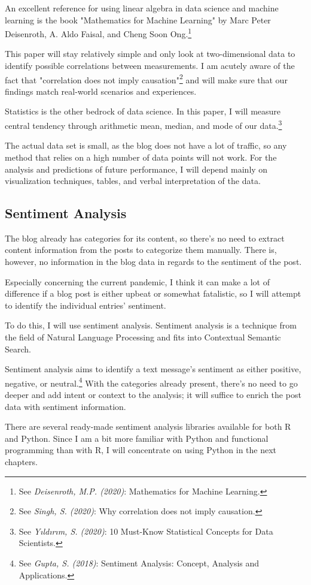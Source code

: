 An excellent reference for using linear algebra in data science and machine learning is the book "Mathematics for Machine Learning" by Marc Peter Deisenroth, A. Aldo Faisal, and Cheng Soon Ong.\footnote{See \textit{Deisenroth, M.P. (2020)}: Mathematics for Machine Learning.\cite{mathematicsML}}

This paper will stay relatively simple and only look at two-dimensional data to identify possible correlations between measurements. I am acutely aware of the fact that "correlation does not imply causation"\footnote{See \textit{Singh, S. (2020)}: Why correlation does not imply causation.\cite{correlateCause}} and will make sure that our findings match real-world scenarios and experiences.

Statistics is the other bedrock of data science. In this paper, I will measure central tendency through arithmetic mean, median, and mode of our data.\footnote{See \textit{Yıldırım, S. (2020)}: 10 Must-Know Statistical Concepts for Data Scientists.\cite{bedrockScience}}

The actual data set is small, as the blog does not have a lot of traffic, so any method that relies on a high number of data points will not work. For the analysis and predictions of future performance, I will depend mainly on visualization techniques, tables, and verbal interpretation of the data.

\subsection{Sentiment Analysis}

The blog already has categories for its content, so there's no need to extract content information from the posts to categorize them manually. There is, however, no information in the blog data in regards to the sentiment of the post.

Especially concerning the current pandemic, I think it can make a lot of difference if a blog post is either upbeat or somewhat fatalistic, so I will attempt to identify the individual entries' sentiment.

To do this, I will use sentiment analysis. Sentiment analysis is a technique from the field of Natural Language Processing and fits into Contextual Semantic Search. 

Sentiment analysis aims to identify a text message's sentiment as either positive, negative, or neutral.\footnote{See \textit{Gupta, S. (2018)}: Sentiment Analysis: Concept, Analysis and Applications.\cite{sentimentAnalysis}} With the categories already present, there's no need to go deeper and add intent or context to the analysis; it will suffice to enrich the post data with sentiment information.

There are several ready-made sentiment analysis libraries available for both R and Python. Since I am a bit more familiar with Python and functional programming than with R, I will concentrate on using Python in the next chapters.
